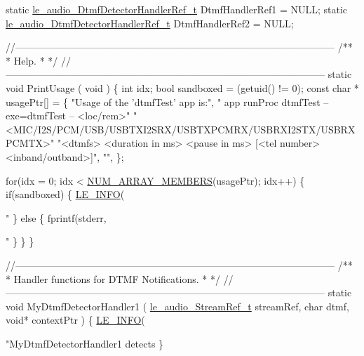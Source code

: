\begin{DoxyCodeInclude}
\textcolor{keyword}{static} \hyperlink{le__audio__interface_8h_a2db60899cdaa84759075a7955ed24511}{le\_audio\_DtmfDetectorHandlerRef\_t} DtmfHandlerRef1 = NULL;
\textcolor{keyword}{static} \hyperlink{le__audio__interface_8h_a2db60899cdaa84759075a7955ed24511}{le\_audio\_DtmfDetectorHandlerRef\_t} DtmfHandlerRef2 = NULL;


\textcolor{comment}{//--------------------------------------------------------------------------------------------------}\textcolor{comment}{}
\textcolor{comment}{/**}
\textcolor{comment}{ * Help.}
\textcolor{comment}{ *}
\textcolor{comment}{ */}
\textcolor{comment}{//--------------------------------------------------------------------------------------------------}
\textcolor{keyword}{static} \textcolor{keywordtype}{void} PrintUsage
(
    \textcolor{keywordtype}{void}
)
\{
    \textcolor{keywordtype}{int} idx;
    \textcolor{keywordtype}{bool} sandboxed = (getuid() != 0);
    \textcolor{keyword}{const} \textcolor{keywordtype}{char} * usagePtr[] = \{
       \textcolor{stringliteral}{"Usage of the 'dtmfTest' app is:"},
       \textcolor{stringliteral}{"  app runProc dtmfTest --exe=dtmfTest -- <loc/rem>"}
       \textcolor{stringliteral}{"<MIC/I2S/PCM/USB/USBTXI2SRX/USBTXPCMRX/USBRXI2STX/USBRXPCMTX>"}
       \textcolor{stringliteral}{"<dtmfs> <duration in ms> <pause in ms> [<tel number> <inband/outband>]"},
       \textcolor{stringliteral}{""},
    \};

    \textcolor{keywordflow}{for}(idx = 0; idx < \hyperlink{le__basics_8h_a8d8f28a045f43b477cafb67a99894c07}{NUM\_ARRAY\_MEMBERS}(usagePtr); idx++)
    \{
        \textcolor{keywordflow}{if}(sandboxed)
        \{
            \hyperlink{le__log_8h_a23e6d206faa64f612045d688cdde5808}{LE\_INFO}(\textcolor{stringliteral}{"%
        \}
        \textcolor{keywordflow}{else}
        \{
            fprintf(stderr, \textcolor{stringliteral}{"%
        \}
    \}
\}

\textcolor{comment}{//--------------------------------------------------------------------------------------------------}\textcolor{comment}{}
\textcolor{comment}{/**}
\textcolor{comment}{ * Handler functions for DTMF Notifications.}
\textcolor{comment}{ *}
\textcolor{comment}{ */}
\textcolor{comment}{//--------------------------------------------------------------------------------------------------}
\textcolor{keyword}{static} \textcolor{keywordtype}{void} MyDtmfDetectorHandler1
(
    \hyperlink{le__audio__interface_8h_a9a46ff5a5afa61f1bc76120ab9e4da0a}{le\_audio\_StreamRef\_t} streamRef,
    \textcolor{keywordtype}{char}  dtmf,
    \textcolor{keywordtype}{void}* contextPtr
)
\{
    \hyperlink{le__log_8h_a23e6d206faa64f612045d688cdde5808}{LE\_INFO}(\textcolor{stringliteral}{"MyDtmfDetectorHandler1 detects %
\}

}}}
\end{DoxyCodeInclude}
